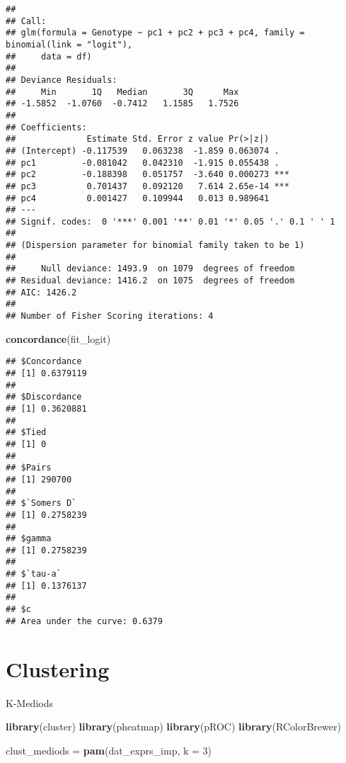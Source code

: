 \documentclass[]{article}
\newenvironment{Shaded}{\begin{snugshade}}{\end{snugshade}}
\newcommand{\KeywordTok}[1]{\textcolor[rgb]{0.13,0.29,0.53}{\textbf{#1}}}
\newcommand{\DataTypeTok}[1]{\textcolor[rgb]{0.13,0.29,0.53}{#1}}
\newcommand{\DecValTok}[1]{\textcolor[rgb]{0.00,0.00,0.81}{#1}}
\newcommand{\StringTok}[1]{\textcolor[rgb]{0.31,0.60,0.02}{#1}}
\newcommand{\NormalTok}[1]{#1}
\begin{document}
\begin{verbatim}
## 
## Call:
## glm(formula = Genotype ~ pc1 + pc2 + pc3 + pc4, family = binomial(link = "logit"), 
##     data = df)
## 
## Deviance Residuals: 
##     Min       1Q   Median       3Q      Max  
## -1.5852  -1.0760  -0.7412   1.1585   1.7526  
## 
## Coefficients:
##              Estimate Std. Error z value Pr(>|z|)    
## (Intercept) -0.117539   0.063238  -1.859 0.063074 .  
## pc1         -0.081042   0.042310  -1.915 0.055438 .  
## pc2         -0.188398   0.051757  -3.640 0.000273 ***
## pc3          0.701437   0.092120   7.614 2.65e-14 ***
## pc4          0.001427   0.109944   0.013 0.989641    
## ---
## Signif. codes:  0 '***' 0.001 '**' 0.01 '*' 0.05 '.' 0.1 ' ' 1
## 
## (Dispersion parameter for binomial family taken to be 1)
## 
##     Null deviance: 1493.9  on 1079  degrees of freedom
## Residual deviance: 1416.2  on 1075  degrees of freedom
## AIC: 1426.2
## 
## Number of Fisher Scoring iterations: 4
\end{verbatim}

\begin{Shaded}
\begin{Highlighting}[]
\KeywordTok{concordance}\NormalTok{(fit_logit)}
\end{Highlighting}
\end{Shaded}

\begin{verbatim}
## $Concordance
## [1] 0.6379119
## 
## $Discordance
## [1] 0.3620881
## 
## $Tied
## [1] 0
## 
## $Pairs
## [1] 290700
## 
## $`Somers D`
## [1] 0.2758239
## 
## $gamma
## [1] 0.2758239
## 
## $`tau-a`
## [1] 0.1376137
## 
## $c
## Area under the curve: 0.6379
\end{verbatim}

\section{Clustering}\label{clustering}

K-Mediods

\begin{Shaded}
\begin{Highlighting}[]
\KeywordTok{library}\NormalTok{(cluster)}
\KeywordTok{library}\NormalTok{(pheatmap)}
\KeywordTok{library}\NormalTok{(pROC)}
\KeywordTok{library}\NormalTok{(RColorBrewer)}
\end{Highlighting}
\end{Shaded}

\begin{Shaded}
\begin{Highlighting}[]
\NormalTok{clust_mediods =}\StringTok{ }\KeywordTok{pam}\NormalTok{(dat_exprs_imp, }\DataTypeTok{k =} \DecValTok{3}\NormalTok{)}
\end{Highlighting}
\end{Shaded}
\end{document}
